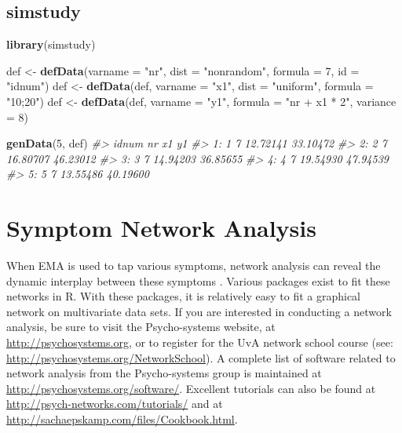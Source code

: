 \documentclass[]{book}
\newenvironment{Shaded}{\begin{snugshade}}{\end{snugshade}}
\newcommand{\KeywordTok}[1]{\textcolor[rgb]{0.13,0.29,0.53}{\textbf{#1}}}
\newcommand{\DataTypeTok}[1]{\textcolor[rgb]{0.13,0.29,0.53}{#1}}
\newcommand{\DecValTok}[1]{\textcolor[rgb]{0.00,0.00,0.81}{#1}}
\newcommand{\StringTok}[1]{\textcolor[rgb]{0.31,0.60,0.02}{#1}}
\newcommand{\CommentTok}[1]{\textcolor[rgb]{0.56,0.35,0.01}{\textit{#1}}}
\newcommand{\NormalTok}[1]{#1}
\begin{document}
\subsection{simstudy}\label{simstudy}

\begin{Shaded}
\begin{Highlighting}[]
\KeywordTok{library}\NormalTok{(simstudy)}

\NormalTok{def <-}\StringTok{ }\KeywordTok{defData}\NormalTok{(}\DataTypeTok{varname =} \StringTok{"nr"}\NormalTok{, }\DataTypeTok{dist =} \StringTok{"nonrandom"}\NormalTok{, }\DataTypeTok{formula =} \DecValTok{7}\NormalTok{, }\DataTypeTok{id =} \StringTok{"idnum"}\NormalTok{)}
\NormalTok{def <-}\StringTok{ }\KeywordTok{defData}\NormalTok{(def, }\DataTypeTok{varname =} \StringTok{"x1"}\NormalTok{, }\DataTypeTok{dist =} \StringTok{"uniform"}\NormalTok{, }\DataTypeTok{formula =} \StringTok{"10;20"}\NormalTok{)}
\NormalTok{def <-}\StringTok{ }\KeywordTok{defData}\NormalTok{(def, }\DataTypeTok{varname =} \StringTok{"y1"}\NormalTok{, }\DataTypeTok{formula =} \StringTok{"nr + x1 * 2"}\NormalTok{, }\DataTypeTok{variance =} \DecValTok{8}\NormalTok{)}

\KeywordTok{genData}\NormalTok{(}\DecValTok{5}\NormalTok{, def)}
\CommentTok{#>    idnum nr       x1       y1}
\CommentTok{#> 1:     1  7 12.72141 33.10472}
\CommentTok{#> 2:     2  7 16.80707 46.23012}
\CommentTok{#> 3:     3  7 14.94203 36.85655}
\CommentTok{#> 4:     4  7 19.54930 47.94539}
\CommentTok{#> 5:     5  7 13.55486 40.19600}
\end{Highlighting}
\end{Shaded}

\section{Symptom Network Analysis}\label{symptom-network-analysis}

 

When EMA is used to tap various symptoms, network analysis can reveal
the dynamic interplay between these symptoms
\citep{Borsboom2013, Borsboom2017, Bringmann2015}. Various packages
exist to fit these networks in R. With these packages, it is relatively
easy to fit a graphical network on multivariate data sets. If you are
interested in conducting a network analysis, be sure to visit the
Psycho-systems website, at \url{http://psychosystems.org}, or to
register for the UvA network school course (see:
\url{http://psychosystems.org/NetworkSchool}). A complete list of
software related to network analysis from the Psycho-systems group is
maintained at \url{http://psychosystems.org/software/}. Excellent
tutorials can also be found at
\url{http://psych-networks.com/tutorials/} and at
\url{http://sachaepskamp.com/files/Cookbook.html}.
\end{document}
